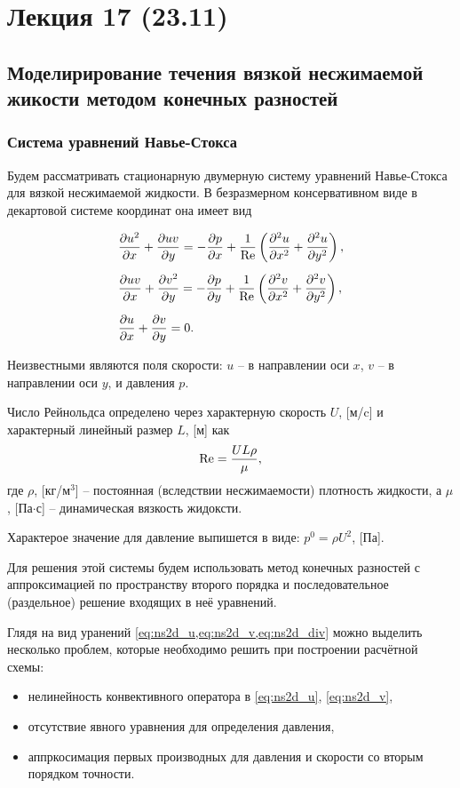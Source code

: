 \section{Лекция 17 (23.11)}

\subsection{Моделирирование течения вязкой несжимаемой жикости методом конечных разностей}
\subsubsection{Система уравнений Навье-Стокса}

Будем рассматривать стационарную двумерную систему уравнений
Навье-Стокса для вязкой несжимаемой жидкости.
В безразмерном консервативном виде в декартовой системе координат она имеет вид

\begin{align}
    \label{eq:ns2d_u}
    & \frac{\partial u^2}{\partial x} + \frac{\partial uv}{\partial y} =
        -\frac{\partial p}{\partial x}
        + \frac{1}{\mathrm{Re}}\left(\frac{\partial^2 u}{\partial x^2} + \frac{\partial^2 u}{\partial y^2}\right),\\[5pt]
    \label{eq:ns2d_v}
    & \frac{\partial uv}{\partial x} + \frac{\partial v^2}{\partial y} =
        -\frac{\partial p}{\partial y}
        + \frac{1}{\mathrm{Re}}\left(\frac{\partial^2 v}{\partial x^2} + \frac{\partial^2 v}{\partial y^2}\right), \\[5pt]
    \label{eq:ns2d_div}
    &\frac{\partial u}{\partial x} + \frac{\partial v}{\partial y} = 0.
\end{align}

Неизвестными являются поля скорости: $u$ -- в направлении оси $x$,
$v$ -- в направлении оси $y$, и давления $p$.

Число Рейнольдса определено через характерную скорость $U$, [м/c] и
характерный линейный размер $L$, [м] как
\begin{equation*}
    \mathrm{Re} = \frac{UL\rho}{\mu},
\end{equation*}
где $\rho$, [кг/м$^3$] -- постоянная (вследствии несжимаемости) плотность жидкости, а
$\mu$, [Па$\cdot$с] -- динамическая вязкость жидоксти.

Характерое значение для давление выпишется в виде:
$ p^0 = \rho U^2 $, [Па].

Для решения этой системы будем использовать метод конечных разностей
с аппроксимацией по пространству второго порядка и последовательное (раздельное) решение входящих в неё
уравнений.

Глядя на вид уранений \cref{eq:ns2d_u,eq:ns2d_v,eq:ns2d_div}
можно выделить несколько проблем, которые необходимо решить
при построении расчётной схемы:
\begin{itemize}
\item нелинейность конвективного оператора в \eqref{eq:ns2d_u}, \eqref{eq:ns2d_v},
\item отсутствие явного уравнения для определения давления,
\item аппркосимация первых производных для давления и скорости со вторым порядком точности.
\end{itemize}



